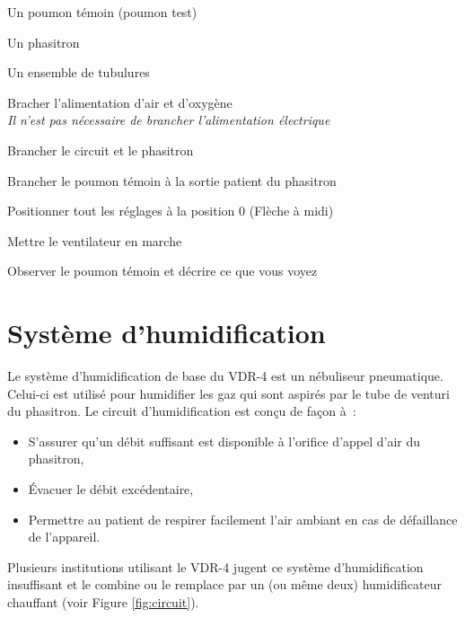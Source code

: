 \begin{exercice}
	\begin{materiel}
		\item Un poumon témoin (poumon test)
		\item Un phasitron
		\item Un ensemble de tubulures 
	\end{materiel}

	\begin{procedure}
	\item Bracher l'alimentation d'air et d'oxygène\\
		{\em \small Il n'est pas nécessaire de brancher l'alimentation électrique}
	\item Brancher le circuit et le phasitron
	\item Brancher le poumon témoin à la sortie patient du phasitron
	\item Positionner tout les réglages à la position 0 (Flèche à midi)
	\item Mettre le ventilateur en marche
	\item Observer le poumon témoin et décrire ce que vous voyez
	\end{procedure}
\end{exercice}
\section{Système d’humidification}

Le système d’humidification de base du VDR-4 est un nébuliseur pneumatique.
Celui-ci est utilisé pour humidifier les gaz qui sont aspirés par le tube de
venturi du phasitron. Le circuit d’humidification est conçu de façon à :

\begin{itemize}
	\item S'assurer qu’un débit suffisant est disponible à l'orifice d'appel d'air du phasitron,
	\item Évacuer le débit excédentaire,
	\item Permettre au patient de respirer facilement l'air ambiant en cas de défaillance de l'appareil.
\end{itemize}

Plusieurs institutions utilisant le VDR-4 jugent ce système 
d'humidification insuffisant et le combine ou le remplace par un 
(ou même deux) humidificateur chauffant (voir Figure \ref{fig:circuit}).


